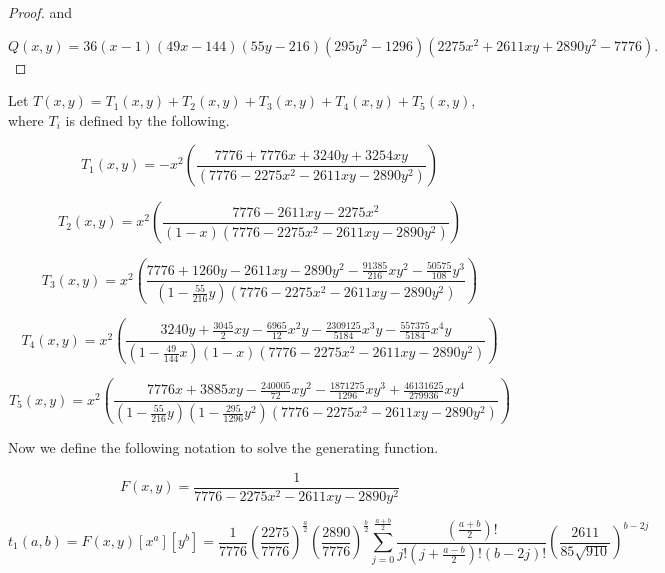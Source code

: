 \documentclass[12pt]{article}
\theoremstyle{plain}
\theoremstyle{definition}
\theoremstyle{remark}
\theoremstyle{definition}
\begin{document}
\begin{landscape}
\begin{proof}
and

$Q(x,y) = 36 (x - 1)(49 x - 144)(55 y - 216)(295 y^{2} - 1296)(2275 x^{2} + 2611 x y + 2890 y^{2} - 7776).
$

\end{proof}

Let $T(x,y) = T_1(x,y) + T_2(x,y) + T_3(x,y) + T_4(x,y) + T_5(x,y)$, where $T_i$ is defined by the following.

\begin{equation}
    T_1(x,y) = -x^2\left(\frac{7776 + 7776x + 3240y + 3254xy}{(7776 - 2275x^2 - 2611xy - 2890y^2)}\right)
\end{equation}

\begin{equation}
    T_2(x,y) = x^2\left(\frac{7776-2611xy-2275x^2}{(1-x)(7776 - 2275x^2 - 2611xy - 2890y^2)}\right)
\end{equation}

\begin{equation}
    T_3(x,y) = x^2\left(\frac{7776+1260y-2611xy-2890y^2-\frac{91385}{216}xy^2 - \frac{50575}{108}y^3}{(1-\frac{55}{216}y)(7776 - 2275x^2 - 2611xy - 2890y^2)}\right)
\end{equation}

\begin{equation}
    T_4(x,y) = x^2\left(\frac{3240y + \frac{3045}{2} xy - \frac{6965}{12} x^{2} y - \frac{2309125}{5184} x^{3} y - \frac{557375}{5184} x^{4} y}{(1-\frac{49}{144}x)(1-x)(7776 - 2275x^2 - 2611xy - 2890y^2)}\right)
\end{equation}

\begin{equation}
    T_5(x,y) = x^2\left(\frac{7776 x + 3885 x y - \frac{240005}{72} x y^{2} - \frac{1871275}{1296} x y^{3} + \frac{46131625}{279936} x y^{4}}{(1-\frac{55}{216}y)(1-\frac{295}{1296}y^2)(7776 - 2275x^2 - 2611xy - 2890y^2)}\right)
\end{equation}

Now we define the following notation to solve the generating function.

\begin{equation}
    F(x,y) = \frac{1}{7776-2275x^2-2611xy-2890y^2}
\end{equation}

\begin{equation}
    t_1(a,b) = F(x,y)[x^a][y^b] = \frac{1}{7776} \left(\frac{2275}{7776}\right)^{\frac{a}{2}} \left(\frac{2890}{7776}\right)^{\frac{b}{2}} \sum_{j=0}^{\frac{a+b}{2}}\frac{\left(\frac{a+b}{2}\right)!}{j!(j+\frac{a-b}{2})!(b-2j)!}\left(\frac{2611}{85\sqrt{910}}\right)^{b-2j}
\end{equation}


\end{landscape}
\end{document}

